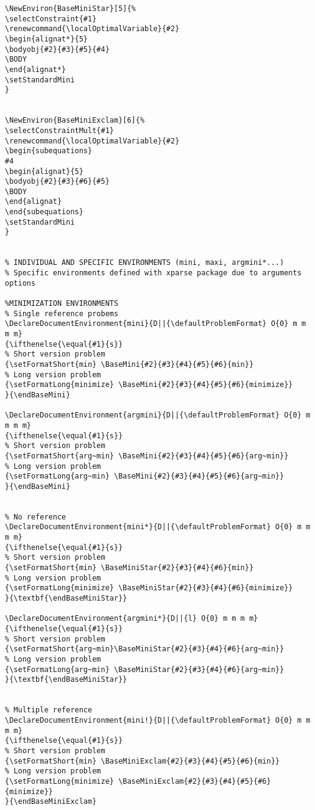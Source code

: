 \documentclass[a4paper]{article}
\begin{document}
\begin{lstlisting}
\NewEnviron{BaseMiniStar}[5]{%
\selectConstraint{#1}
\renewcommand{\localOptimalVariable}{#2}
\begin{alignat*}{5}
\bodyobj{#2}{#3}{#5}{#4}
\BODY
\end{alignat*}
\setStandardMini
}


\NewEnviron{BaseMiniExclam}[6]{%
\selectConstraintMult{#1}
\renewcommand{\localOptimalVariable}{#2}
\begin{subequations}
#4
\begin{alignat}{5}
\bodyobj{#2}{#3}{#6}{#5}
\BODY
\end{alignat}
\end{subequations}
\setStandardMini
}


% INDIVIDUAL AND SPECIFIC ENVIRONMENTS (mini, maxi, argmini*...)
% Specific environments defined with xparse package due to arguments options

%MINIMIZATION ENVIRONMENTS
% Single reference probems
\DeclareDocumentEnvironment{mini}{D||{\defaultProblemFormat} O{0} m m m m}
{\ifthenelse{\equal{#1}{s}}
% Short version problem
{\setFormatShort{min} \BaseMini{#2}{#3}{#4}{#5}{#6}{min}}
% Long version problem	
{\setFormatLong{minimize} \BaseMini{#2}{#3}{#4}{#5}{#6}{minimize}}
}{\endBaseMini}

\DeclareDocumentEnvironment{argmini}{D||{\defaultProblemFormat} O{0} m m m m}
{\ifthenelse{\equal{#1}{s}}
% Short version problem
{\setFormatShort{arg~min} \BaseMini{#2}{#3}{#4}{#5}{#6}{arg~min}}
% Long version problem	
{\setFormatLong{arg~min} \BaseMini{#2}{#3}{#4}{#5}{#6}{arg~min}}
}{\endBaseMini}


% No reference
\DeclareDocumentEnvironment{mini*}{D||{\defaultProblemFormat} O{0} m m m m}
{\ifthenelse{\equal{#1}{s}}
% Short version problem
{\setFormatShort{min} \BaseMiniStar{#2}{#3}{#4}{#6}{min}}
% Long version problem	
{\setFormatLong{minimize} \BaseMiniStar{#2}{#3}{#4}{#6}{minimize}}
}{\textbf{\endBaseMiniStar}}

\DeclareDocumentEnvironment{argmini*}{D||{l} O{0} m m m m}
{\ifthenelse{\equal{#1}{s}}
% Short version problem
{\setFormatShort{arg~min}\BaseMiniStar{#2}{#3}{#4}{#6}{arg~min}}
% Long version problem	
{\setFormatLong{arg~min} \BaseMiniStar{#2}{#3}{#4}{#6}{arg~min}}
}{\textbf{\endBaseMiniStar}}


% Multiple reference
\DeclareDocumentEnvironment{mini!}{D||{\defaultProblemFormat} O{0} m m m m}
{\ifthenelse{\equal{#1}{s}}
% Short version problem
{\setFormatShort{min} \BaseMiniExclam{#2}{#3}{#4}{#5}{#6}{min}}
% Long version problem	
{\setFormatLong{minimize} \BaseMiniExclam{#2}{#3}{#4}{#5}{#6}{minimize}}
}{\endBaseMiniExclam}


\end{lstlisting}
\end{document}
